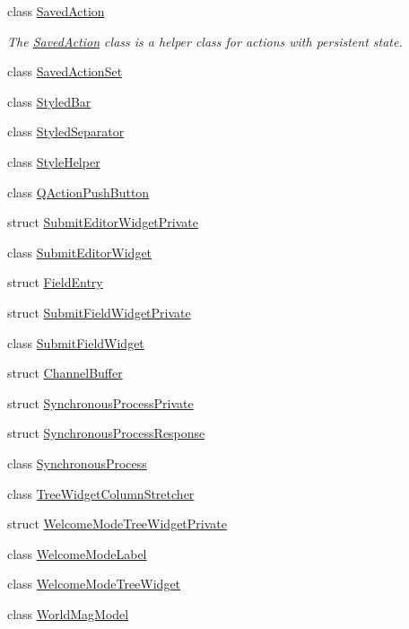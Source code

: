 \begin{DoxyCompactItemize}
\item 
class \hyperlink{class_utils_1_1_saved_action}{Saved\-Action}
\begin{DoxyCompactList}\small\item\em The \hyperlink{class_utils_1_1_saved_action}{Saved\-Action} class is a helper class for actions with persistent state. \end{DoxyCompactList}\item 
class \hyperlink{class_utils_1_1_saved_action_set}{Saved\-Action\-Set}
\item 
class \hyperlink{class_utils_1_1_styled_bar}{Styled\-Bar}
\item 
class \hyperlink{class_utils_1_1_styled_separator}{Styled\-Separator}
\item 
class \hyperlink{class_utils_1_1_style_helper}{Style\-Helper}
\item 
class \hyperlink{class_utils_1_1_q_action_push_button}{Q\-Action\-Push\-Button}
\item 
struct \hyperlink{struct_utils_1_1_submit_editor_widget_private}{Submit\-Editor\-Widget\-Private}
\item 
class \hyperlink{class_utils_1_1_submit_editor_widget}{Submit\-Editor\-Widget}
\item 
struct \hyperlink{struct_utils_1_1_field_entry}{Field\-Entry}
\item 
struct \hyperlink{struct_utils_1_1_submit_field_widget_private}{Submit\-Field\-Widget\-Private}
\item 
class \hyperlink{class_utils_1_1_submit_field_widget}{Submit\-Field\-Widget}
\item 
struct \hyperlink{struct_utils_1_1_channel_buffer}{Channel\-Buffer}
\item 
struct \hyperlink{struct_utils_1_1_synchronous_process_private}{Synchronous\-Process\-Private}
\item 
struct \hyperlink{struct_utils_1_1_synchronous_process_response}{Synchronous\-Process\-Response}
\item 
class \hyperlink{class_utils_1_1_synchronous_process}{Synchronous\-Process}
\item 
class \hyperlink{class_utils_1_1_tree_widget_column_stretcher}{Tree\-Widget\-Column\-Stretcher}
\item 
struct \hyperlink{struct_utils_1_1_welcome_mode_tree_widget_private}{Welcome\-Mode\-Tree\-Widget\-Private}
\item 
class \hyperlink{class_utils_1_1_welcome_mode_label}{Welcome\-Mode\-Label}
\item 
class \hyperlink{class_utils_1_1_welcome_mode_tree_widget}{Welcome\-Mode\-Tree\-Widget}
\item 
class \hyperlink{class_utils_1_1_world_mag_model}{World\-Mag\-Model}
\end{DoxyCompactItemize}
